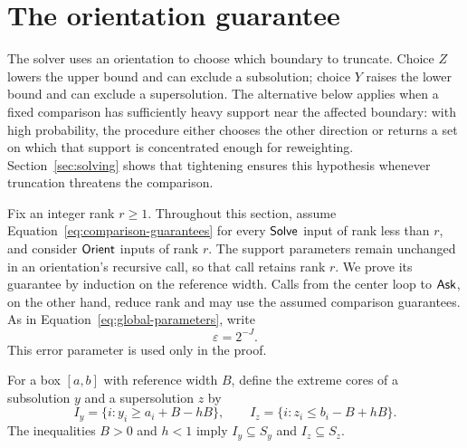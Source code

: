 \section{The orientation guarantee}
\label{sec:orientation}

The solver uses an orientation to choose which boundary to truncate.
Choice \(Z\) lowers the upper bound and can exclude a subsolution;
choice \(Y\) raises the lower bound and can exclude a supersolution.
The alternative below applies when a fixed comparison has sufficiently
heavy support near the affected boundary: with high probability, the
procedure either chooses the other direction or returns a set on which
that support is concentrated enough for reweighting.
Section~\ref{sec:solving} shows that tightening ensures this hypothesis
whenever truncation threatens the comparison.

Fix an integer rank \(r\geq1\). Throughout this section, assume
Equation~\eqref{eq:comparison-guarantees} for every \(\mathsf{Solve}\) input of
rank less than \(r\), and consider \(\mathsf{Orient}\) inputs of rank \(r\).
The support parameters remain unchanged in an orientation's recursive
call, so that call retains rank \(r\). We prove its guarantee by
induction on the reference width. Calls from the center loop to
\(\mathsf{Ask}\), on the other hand, reduce rank and may use the assumed
comparison guarantees. As in Equation~\eqref{eq:global-parameters}, write
\[
  \varepsilon=2^{-J}.
\]
This error parameter is used only in the proof.

For a box \([a,b]\) with reference width \(B\), define the extreme
cores of a subsolution \(y\) and a supersolution \(z\) by
\begin{equation}
\label{eq:orientation-cores}
  I_y=\{i:y_i\geq a_i+B-hB\},
  \qquad
  I_z=\{i:z_i\leq b_i-B+hB\}.
\end{equation}
The inequalities \(B>0\) and \(h<1\) imply
\(I_y\subseteq S_y\) and \(I_z\subseteq S_z\).

